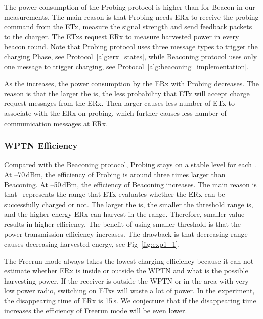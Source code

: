 \documentclass[11pt,draftclsnofoot,journal,onecolumn]{IEEEtran}
\newcommand{\txRssiThreshold}{}
\begin{document}
The power consumption of the Probing protocol is higher than for Beacon in our measurements. The main reason is that Probing needs ERx to receive the probing command from the ETx, measure the signal strength and send feedback packets to the charger. The ETxs request ERx to measure harvested power in every beacon round. Note that Probing protocol uses three message types to trigger the charging Phase, see Protocol~\ref{alg:erx_states}, while Beaconing protocol uses only one message to trigger charging, see Protocol~\ref{alg:beaconing_implementation}.

As the \txRssiThreshold increases, the power consumption by the ERx with Probing decreases. The reason is that the larger the \txRssiThreshold is, the less probability that ETx will accept charge request messages from the ERx. Then larger \txRssiThreshold causes less number of ETx to associate with the ERx on probing, which further causes less number of communication messages at ERx.

\subsubsection{WPTN Efficiency}

Compared with the Beaconing protocol, Probing stays on a stable level for each \txRssiThreshold. At --70\,dBm, the efficiency of Probing is around three times larger than Beaconing. At --50\,dBm, the efficiency of Beaconing increases. The main reason is that \txRssiThreshold~represents the range that ETx evaluates whether the ERx can be successfully charged or not. The larger the \txRssiThreshold is, the smaller the threshold range is, and the higher energy ERx can harvest in the range. Therefore, smaller \txRssiThreshold value results in higher efficiency. The benefit of using smaller threshold \txRssiThreshold is that the power transmission efficiency increases. The drawback is that decreasing range causes decreasing harvested energy, see Fig~\ref{fig:exp1_1}.

The Freerun mode always takes the lowest charging efficiency because it can not estimate whether ERx is inside or outside the WPTN and what is the possible harvesting power. If the receiver is outside the WPTN or in the area with very low power radio, switching on ETxs will waste a lot of power. In the experiment, the disappearing time of ERx is 15\,s. We conjecture that if the disappearing time increases the efficiency of Freerun mode will be even lower.
\end{document}
